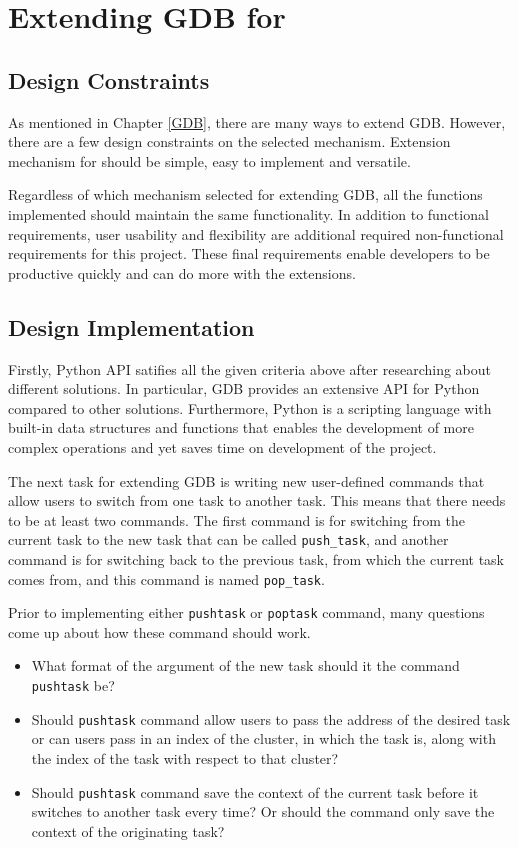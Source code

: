 \chapter{Extending GDB for \uCPP}
\section{Design Constraints}
As mentioned in Chapter \ref{GDB}, there are many ways to extend GDB. However,
there are a few design constraints on the selected mechanism. Extension
mechanism for \uCPPS should be simple, easy to implement and versatile.

Regardless of which mechanism selected for extending GDB, all the functions
implemented should maintain the same functionality. In addition to functional
requirements, user usability and flexibility are additional required
non-functional requirements for this
project. These final requirements enable developers to be productive quickly
and can do more with the extensions.

\section{Design Implementation}
Firstly, Python API satifies all the given criteria above after researching
about different solutions. In particular, GDB provides an extensive API for
Python compared to other solutions. Furthermore, Python is a scripting language with built-in
data structures and functions that enables the development of more complex
operations and yet saves time on development of the project.

The next task for extending GDB is writing new user-defined commands that allow
users to switch from one task to another task. This means that there needs to be at
least two commands. The first command is for switching from the current task to
the new task that can be called \verb|push_task|, and another command
is for switching back to the previous task, from which the current task comes
from, and this command is named \verb|pop_task|.

Prior to implementing either \verb|pushtask| or \verb|poptask| command, many questions come up about how
these command should work.
\begin{itemize}
\item What format of the argument of the new task should it the command
\verb|pushtask| be?
\item Should \verb|pushtask| command allow users to pass the address of the desired task or can users
pass in an index of the cluster, in which the task is, along with the index of
the task with respect to that cluster?
\item Should \verb|pushtask| command save the context of the current task before it switches to
another task every time? Or should the command only save the context of the
originating task?
\end{itemize}

